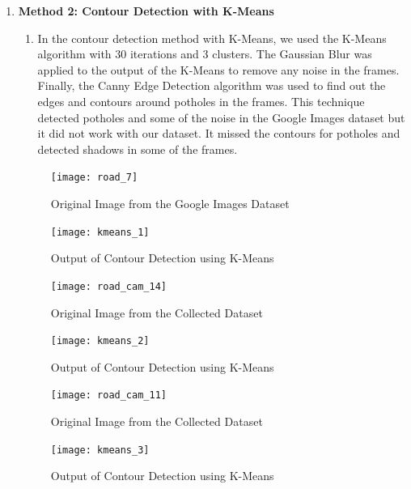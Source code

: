 \begin{enumerate}
\begin{enumerate}
    \item \textbf{Method 2: Contour Detection with K-Means}
    \begin{enumerate}
        \item In the contour detection method with K-Means, we used the K-Means algorithm with 30 iterations and 3 clusters. The Gaussian Blur was applied to the output of the K-Means to remove any noise in the frames. Finally, the Canny Edge Detection algorithm was used to find out the edges and contours around potholes in the frames. This technique detected potholes and some of the noise in the Google Images dataset but it did not work with our dataset. It missed the contours for potholes and detected shadows in some of the frames.
    \end{enumerate}
    \pagebreak
    
    \begin{figure}[ht!]
        \centering
        \texttt{[image: road\_7]}
        \caption{Original Image from the Google Images Dataset}
    \end{figure}

    \begin{figure}[ht!]
        \centering
        \texttt{[image: kmeans\_1]}
        \caption{Output of Contour Detection using K-Means}
    \end{figure}
    \pagebreak
    
    \begin{figure}[ht!]
        \centering
        \texttt{[image: road\_cam\_14]}
        \caption{Original Image from the Collected Dataset}
    \end{figure}

    \begin{figure}[ht!]
        \centering
        \texttt{[image: kmeans\_2]}
        \caption{Output of Contour Detection using K-Means}
    \end{figure}
    \pagebreak
    
    \begin{figure}[ht!]
        \centering
        \texttt{[image: road\_cam\_11]}
        \caption{Original Image from the Collected Dataset}
    \end{figure}

    \begin{figure}[ht!]
        \centering
        \texttt{[image: kmeans\_3]}
        \caption{Output of Contour Detection using K-Means}
    \end{figure}
    \pagebreak
    

\end{enumerate}
\end{enumerate}
